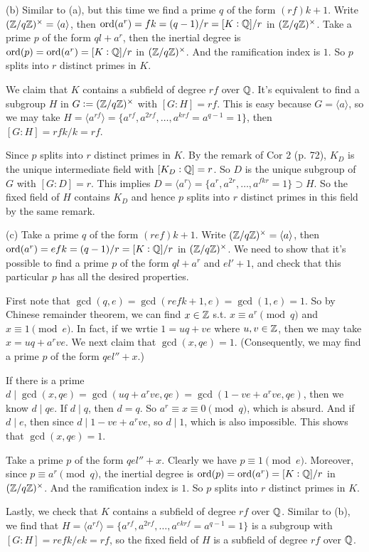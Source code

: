 \documentclass[../Marcus.tex]{subfiles}
\begin{document}
(b) Similar to (a), but this time we find a prime $q$ of the form $(rf)k+1$. Write $(\mathbb{Z}/q\mathbb{Z})^\times=\langle a\rangle$, then $\operatorname{ord}(a^r)=fk=(q-1)/r=[K:\mathbb{Q}]/r$ in $(\mathbb{Z}/q\mathbb{Z})^\times$. Take a prime $p$ of the form $ql+a^r$, then the inertial degree is $\operatorname{ord}(p)=\operatorname{ord}(a^r)=[K:\mathbb{Q}]/r$ in $(\mathbb{Z}/q\mathbb{Z})^\times$. And the ramification index is $1$. So $p$ splits into $r$ distinct primes in $K$.

We claim that $K$ contains a subfield of degree $rf$ over $\mathbb{Q}$. It's equivalent to find a subgroup $H$ in $G:=(\mathbb{Z}/q\mathbb{Z})^\times$ with $[G:H]=rf$. This is easy because $G=\langle a\rangle$, so we may take $H=\langle a^{rf}\rangle=\{a^{rf},a^{2rf},\ldots,a^{krf}=a^{q-1}=1\}$, then $[G:H]=rfk/k=rf$.

Since $p$ splits into $r$ distinct primes in $K$. By the remark of Cor 2 (p. 72), $K_D$ is the unique intermediate field with $[K_D:\mathbb{Q}]=r$. So $D$ is the unique subgroup of $G$ with $[G:D]=r$. This implies $D=\langle a^r\rangle=\{a^r,a^{2r},\ldots,a^{fkr}=1\}\supset H$. So the fixed field of $H$ contains $K_D$ and hence $p$ splits into $r$ distinct primes in this field by the same remark.

(c) Take a prime $q$ of the form $(ref)k+1$. Write $(\mathbb{Z}/q\mathbb{Z})^\times=\langle a\rangle$, then $\operatorname{ord}(a^r)=efk=(q-1)/r=[K:\mathbb{Q}]/r$ in $(\mathbb{Z}/q\mathbb{Z})^\times$. We need to show that it's possible to find a prime $p$ of the form $ql+a^r$ and $el'+1$, and check that this particular $p$ has all the desired properties.

First note that $\gcd(q,e)=\gcd(refk+1,e)=\gcd(1,e)=1$. So by Chinese remainder theorem, we can find $x\in\mathbb{Z}$ s.t. $x\equiv a^r\pmod{q}$ and $x\equiv 1\pmod{e}$. In fact, if we wrtie $1=uq+ve$ where $u,v\in\mathbb{Z}$, then we may take $x=uq+a^rve$. We next claim that $\gcd(x,qe)=1$. (Consequently, we may find a prime $p$ of the form $qel''+x$.)

If there is a prime $d\mid\gcd(x,qe)=\gcd(uq+a^rve,qe)=\gcd(1-ve+a^rve,qe)$, then we know $d\mid qe$. If $d\mid q$, then $d=q$. So $a^r\equiv x\equiv 0 \pmod{q}$, which is absurd. And if $d\mid e$, then since $d\mid 1-ve+a^rve$, so $d\mid 1$, which is also impossible. This shows that $\gcd(x,qe)=1$.

Take a prime $p$ of the form $qel''+x$. Clearly we have $p\equiv 1\pmod{e}$. Moreover, since $p\equiv a^r\pmod{q}$, the inertial degree is $\operatorname{ord}(p)=\operatorname{ord}(a^r)=[K:\mathbb{Q}]/r$ in $(\mathbb{Z}/q\mathbb{Z})^\times$. And the ramification index is $1$. So $p$ splits into $r$ distinct primes in $K$.

Lastly, we check that $K$ contains a subfield of degree $rf$ over $\mathbb{Q}$. Similar to (b), we find that $H=\langle a^{rf}\rangle=\{a^{rf},a^{2rf},\ldots,a^{ekrf}=a^{q-1}=1\}$ is a subgroup with $[G:H]=refk/ek=rf$, so the fixed field of $H$ is a subfield of degree $rf$ over $\mathbb{Q}$.
\end{document}
